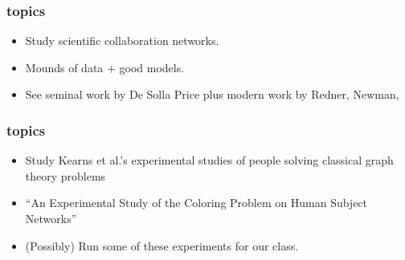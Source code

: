 



\begin{frame}
  \frametitle{topics}

  \begin{itemize}
  \item Study scientific collaboration networks.
  \item Mounds of data + good models.
  \item See seminal work by De Solla Price\cite{price1965a}
    plus modern work by Redner, Newman, \etal
  \end{itemize}

\end{frame}

\begin{frame}
  \frametitle{topics}

  \begin{itemize}
  \item <1->
    Study Kearns et al.'s experimental studies
    of people solving classical graph theory problems\cite{kearns2006a}
  \item <1->
    ``An Experimental Study of the Coloring Problem on Human Subject Networks''
  \item <2-> (Possibly) Run some of these experiments for our class.
  \end{itemize}

\end{frame}


